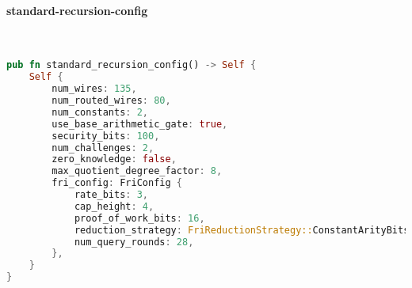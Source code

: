 \paragraph{standard-recursion-config}

\hspace*{\fill} \\
\begin{lstlisting}[language=rust]
pub fn standard_recursion_config() -> Self {
    Self {
        num_wires: 135,
        num_routed_wires: 80,
        num_constants: 2,
        use_base_arithmetic_gate: true,
        security_bits: 100,
        num_challenges: 2,
        zero_knowledge: false,
        max_quotient_degree_factor: 8,
        fri_config: FriConfig {
            rate_bits: 3,
            cap_height: 4,
            proof_of_work_bits: 16,
            reduction_strategy: FriReductionStrategy::ConstantArityBits(4, 5),
            num_query_rounds: 28,
        },
    }
}  
\end{lstlisting}
